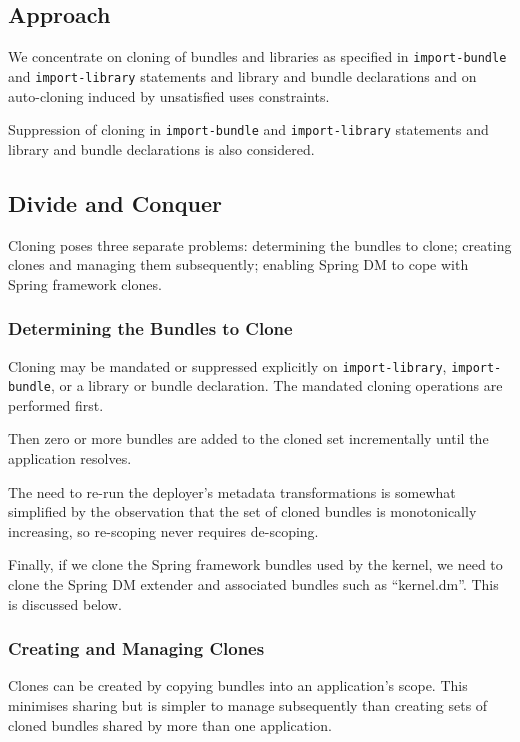 \documentclass[a4paper,12pt]{article}
\begin{document}
\subsection{Approach}

We concentrate on cloning of bundles and libraries as
specified in \texttt{import-bundle} and \texttt{import-library} statements and library and bundle
declarations and on auto-cloning induced by unsatisfied uses constraints.

Suppression of cloning in \texttt{import-bundle} and \texttt{import-library} statements and library and bundle
declarations is also considered.

\subsection{Divide and Conquer}

Cloning poses three separate problems: determining the bundles to clone;
creating clones and managing them subsequently; enabling Spring DM to cope with
Spring framework clones.

\subsubsection{Determining the Bundles to Clone}

Cloning may be mandated or suppressed explicitly on \texttt{import-library}, \texttt{import-bundle},
or a library or bundle declaration. The mandated cloning operations are performed first.

Then zero or more bundles are added to the cloned set incrementally
until the application resolves.

The need to re-run the deployer's metadata transformations is somewhat simplified by the
observation that the set of cloned bundles is monotonically increasing, so re-scoping never
requires de-scoping.

Finally, if we clone the Spring framework bundles used by the kernel, we need to clone the Spring DM extender and associated bundles such as ``kernel.dm''. This is discussed below.

\subsubsection{Creating and Managing Clones}

Clones can be created by copying bundles into an application's scope. This minimises
sharing but is simpler to manage subsequently than creating sets of cloned bundles shared by
more than one application.
\end{document}
